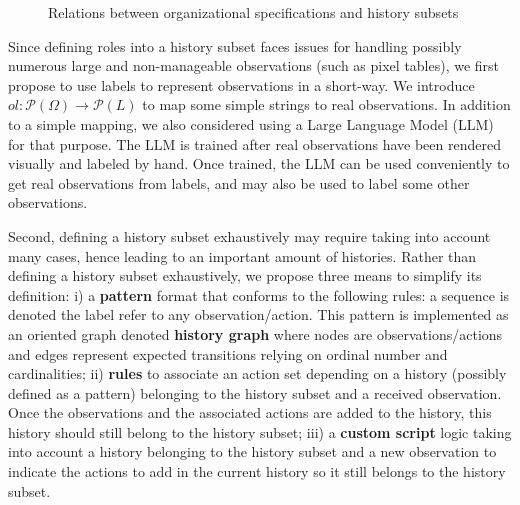 \documentclass[sigconf,anonymous]{aamas}
\begin{document}
\begin{figure}[h!]
  \centering
  
  \caption{Relations between organizational specifications and history subsets}
  \label{fig:PRAHOM_osm_rels}
\end{figure}

Since defining roles into a history subset faces issues for handling possibly numerous large and non-manageable observations (such as pixel tables), we first propose to use labels to represent observations in a short-way. We introduce $ol: \mathcal{P}(\Omega) \rightarrow \mathcal{P}(L)$ to map some simple strings to real observations. In addition to a simple mapping, we also considered using a Large Language Model (LLM) for that purpose. %
The LLM is trained after real observations have been rendered visually and labeled by hand. Once trained, the LLM can be used conveniently to get real observations from labels, and may also be used to label some other observations.

%     

Second, defining a history subset exhaustively may require taking into account many cases, hence leading to an important amount of histories. %
Rather than defining a history subset exhaustively, we propose three means to simplify its definition:
%
\quad i) a \textbf{pattern} format that conforms to the following rules: a sequence is denoted  the  label refer to any observation/action. This pattern is implemented as an oriented graph denoted \textbf{history graph} where nodes are observations/actions and edges represent expected transitions relying on ordinal number and cardinalities; \quad
%
ii) \textbf{rules} to associate an action set depending on a history (possibly defined as a pattern) belonging to the history subset and a received observation. Once the observations and the associated actions are added to the history, this history should still belong to the history subset; \quad
%
iii) a \textbf{custom script} logic taking into account a history belonging to the history subset and a new observation to indicate the actions to add in the current history so it still belongs to the history subset.
\end{document}
